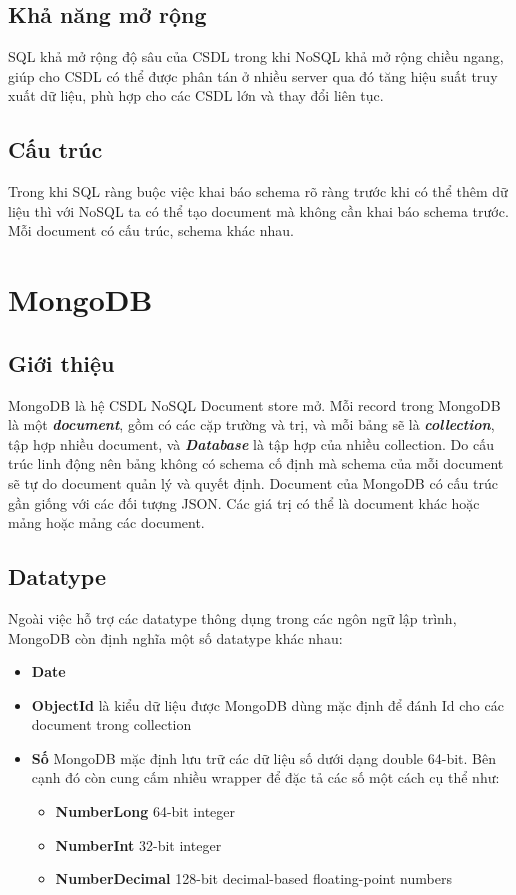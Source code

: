 \subsection{Khả năng mở rộng}
SQL khả mở rộng độ sâu của CSDL trong khi NoSQL khả mở rộng chiều ngang, giúp cho CSDL có thể được phân tán ở nhiều server qua đó tăng hiệu suất truy xuất dữ liệu, phù hợp cho các CSDL lớn và thay đổi liên tục.
\subsection{Cấu trúc}
Trong khi SQL ràng buộc việc khai báo schema rõ ràng trước khi có thể thêm dữ liệu thì với NoSQL ta có thể tạo document mà không cần khai báo schema trước. Mỗi document có cấu trúc, schema khác nhau.
\section{MongoDB}
\subsection{Giới thiệu}
MongoDB là hệ CSDL NoSQL Document store mở. Mỗi record trong MongoDB là một \textbf{\textit{document}}, gồm có các cặp trường và trị, và mỗi bảng sẽ là \textbf{\textit{collection}}, tập hợp nhiều document, và \textbf{\textit{Database}} là tập hợp của nhiều collection. Do cấu trúc linh động nên bảng không có schema cố định mà schema của mỗi document sẽ tự do document quản lý và quyết định. Document của MongoDB có cấu trúc gần giống với các đối tượng JSON. Các giá trị có thể là document khác hoặc mảng hoặc mảng các document.
\subsection{Datatype}
Ngoài việc hỗ trợ các datatype thông dụng trong các ngôn ngữ lập trình, MongoDB còn định nghĩa một số datatype khác nhau:
\begin{itemize}
\item \textbf{Date}
\item \textbf{ObjectId} là kiểu dữ liệu được MongoDB dùng mặc định để đánh Id cho các document trong collection
\item \textbf{Số} MongoDB mặc định lưu trữ các dữ liệu số dưới dạng double 64-bit. Bên cạnh đó còn cung cấm nhiều wrapper để đặc tả các số một cách cụ thể như:
\begin{itemize}
\item \textbf{NumberLong} 64-bit integer
\item \textbf{NumberInt} 32-bit integer
\item \textbf{NumberDecimal} 128-bit decimal-based floating-point numbers
\end{itemize}
\end{itemize}
